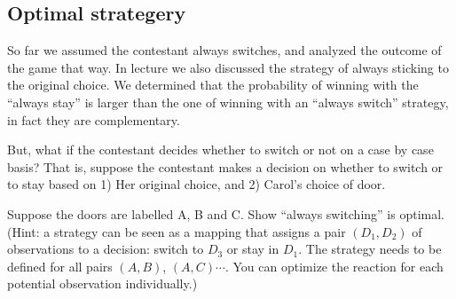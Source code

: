 \documentclass[12pt]{article}
\begin{document}
\newpage
\subsection{Optimal strategery}
So far we assumed the contestant always switches, and analyzed the outcome of the game that way. In lecture we also discussed the strategy of always sticking to the original choice. We determined that the probability of winning with the ``always stay'' is larger than the one of winning with an  ``always switch'' strategy, in fact they are complementary.

But, what if the contestant decides whether to switch or not on a case by case basis? That is, suppose the contestant makes a decision on whether to switch or to stay based on 1) Her original choice, and 2) Carol's choice of door.

 Suppose the doors are labelled A, B and C. Show ``always switching'' is optimal. (Hint: a strategy can be seen as a mapping that assigns a pair $\left(D_1, D_2 \right)$ of observations to a decision: switch to $D_3$ or stay in $D_1$. The strategy needs to be defined for all pairs $\left(A,B\right)$, $\left(A, C\right)\cdots$. You can optimize the reaction for each potential observation individually.)
\end{document}
